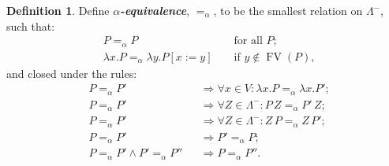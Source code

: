 \documentclass[]{article}
\theoremstyle{definition}
\newtheorem{definition}[theorem]{Definition}
\newcommand{\FV}{\operatorname{FV}}
\newcommand{\preterm}{\Lambda^{-}}
\newcommand{\deftext}[1]{\textit{\textbf{#1}}}
\newcommand{\alphaeq}{=_{\alpha}}
\begin{document}
\begin{definition}\label{alpha equivalence}
	Define \deftext{$\alpha$-equivalence}, $\alphaeq$, to be the smallest relation on $\preterm$, such that:
	\begin{align*}
		&P \alphaeq P &&\text{ for all } P; \\
		&\lambda x. P \alphaeq \lambda y. P [x:= y] &&\text{ if } y \notin \FV(P),
	\end{align*}
	and closed under the rules:
	\begin{align*}
		&P \alphaeq P' && \Rightarrow \forall x \in V: \lambda x.P \alphaeq \lambda x.P'; \\
		&P \alphaeq P' &&\Rightarrow \forall Z \in \preterm : P\, Z \alphaeq P'\, Z; \\
		&P \alphaeq P' &&\Rightarrow \forall Z \in \preterm : Z\, P \alphaeq Z \, P'; \\
		&P \alphaeq P' && \Rightarrow P' \alphaeq P; \\
		&P \alphaeq P' \land  P' \alphaeq P'' && \Rightarrow P \alphaeq P''.
	\end{align*}
\end{definition}
\end{document}
